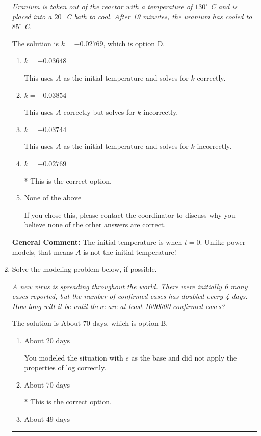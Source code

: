 \documentclass{extbook}[14pt]
\newcommand{\litem}[1]{\item #1

\rule{\textwidth}{0.4pt}}
\begin{document}
\begin{enumerate}
{\begin{center}
    \textit{ Uranium is taken out of the reactor with a temperature of $130^{\circ}$ C and is placed into a $20^{\circ}$ C bath to cool. After 19 minutes, the uranium has cooled to $85^{\circ}$ C. }
\end{center}
The solution is \( k = -0.02769 \), which is option D.\begin{enumerate}[label=\Alph*.]
\item \( k = -0.03648 \)

This uses $A$ as the initial temperature and solves for $k$ correctly.
\item \( k = -0.03854 \)

This uses $A$ correctly but solves for $k$ incorrectly.
\item \( k = -0.03744 \)

This uses $A$ as the initial temperature and solves for $k$ incorrectly.
\item \( k = -0.02769 \)

* This is the correct option.
\item \( \text{None of the above} \)

If you chose this, please contact the coordinator to discuss why you believe none of the other answers are correct.
\end{enumerate}

\textbf{General Comment:} The initial temperature is when $t = 0$. Unlike power models, that means $A$ is not the initial temperature!
}
\litem{
Solve the modeling problem below, if possible.

\begin{center}
    \textit{ A new virus is spreading throughout the world. There were initially 6 many cases reported, but the number of confirmed cases has doubled every 4 days. How long will it be until there are at least 1000000 confirmed cases? }
\end{center}
The solution is \( \text{About } 70 \text{ days} \), which is option B.\begin{enumerate}[label=\Alph*.]
\item \( \text{About } 20 \text{ days} \)

You modeled the situation with $e$ as the base and did not apply the properties of log correctly.
\item \( \text{About } 70 \text{ days} \)

* This is the correct option.
\item \( \text{About } 49 \text{ days} \)


\end{enumerate}}
\end{enumerate}
\end{document}
